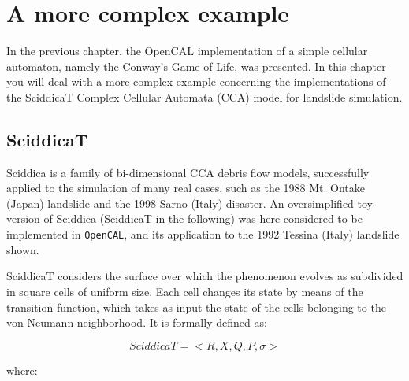 \section{A more complex example}

In the previous chapter, the OpenCAL implementation of a simple
cellular automaton, namely the Conway’s Game of Life, was
presented. In this chapter you will deal with a more complex example
concerning the implementations of the SciddicaT Complex Cellular
Automata (CCA) model for landslide simulation.

\subsection{SciddicaT}
Sciddica is a family of bi-dimensional CCA debris flow models,
successfully applied to the simulation of many real cases, such as the
1988 Mt. Ontake (Japan) landslide and the 1998 Sarno (Italy)
disaster. An oversimplified toy-version of Sciddica (SciddicaT in the
following) was here considered to be implemented in \verb"OpenCAL",
and its application to the 1992 Tessina (Italy) landslide shown.

SciddicaT considers the surface over which the phenomenon evolves as
subdivided in square cells of uniform size. Each cell changes its
state by means of the transition function, which takes as input the
state of the cells belonging to the von Neumann neighborhood. It is
formally defined as:

$$SciddicaT = < R, X, Q , P, \sigma  >$$

where:

